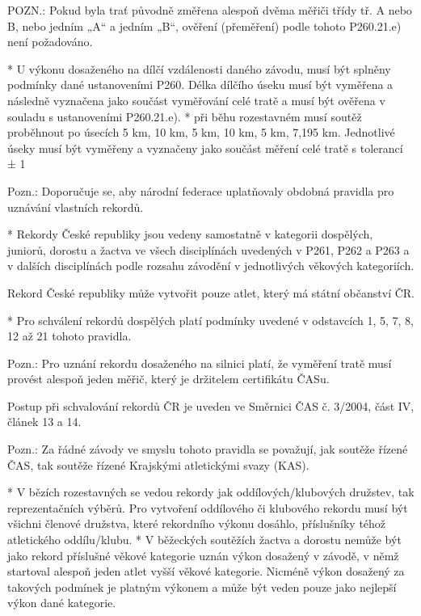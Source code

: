   POZN.: Pokud byla trať původně změřena alespoň dvěma měřiči třídy tř. A nebo B, nebo jedním „A“ a jedním „B“, ověření (přeměření) podle tohoto P260.21.e) není požadováno.

  * U výkonu dosaženého na dílčí vzdálenosti daného závodu, musí být splněny podmínky dané ustanoveními P260. Délka dílčího úseku musí být vyměřena a následně vyznačena jako součást vyměřování celé tratě a musí být ověřena v souladu s ustanoveními P260.21.e).
  * při běhu rozestavném musí soutěž proběhnout po úsecích 5 km, 10 km, 5 km, 10 km, 5 km, 7,195 km. Jednotlivé úseky musí být vyměřeny a vyznačeny jako součást měření celé tratě s tolerancí ± 1 %
  \enditems

Pozn.: Doporučuje se, aby národní federace uplatňovaly obdobná pravidla pro uznávání vlastních rekordů.

* Rekordy České republiky jsou vedeny samostatně v kategorii dospělých, juniorů, dorostu a žactva ve všech disciplínách uvedených v P261, P262 a P263 a v dalších disciplínách podle rozsahu závodění v jednotlivých věkových kategoriích.

Rekord České republiky může vytvořit pouze atlet, který má státní občanství ČR.

* Pro schválení rekordů dospělých platí podmínky uvedené v odstavcích 1, 5, 7, 8, 12 až 21 tohoto pravidla.

Pozn.: Pro uznání rekordu dosaženého na silnici platí, že vyměření tratě musí provést alespoň jeden měřič, který je držitelem certifikátu ČASu.

Postup při schvalování rekordů ČR je uveden ve Směrnici ČAS č. 3/2004, část IV, článek 13 a 14.

Pozn.: Za řádné závody ve smyslu tohoto pravidla se považují, jak soutěže řízené ČAS, tak soutěže řízené Krajskými atletickými svazy (KAS).

* V bězích rozestavných se vedou rekordy jak oddílových/klubových družstev, tak reprezentačních výběrů. Pro vytvoření oddílového či klubového rekordu musí být všichni členové družstva, které rekordního výkonu dosáhlo, příslušníky téhož atletického oddílu/klubu.
* V běžeckých soutěžích žactva a dorostu nemůže být jako rekord příslušné věkové kategorie uznán výkon dosažený v závodě, v němž startoval alespoň jeden atlet vyšší věkové kategorie. Nicméně výkon dosažený za takových podmínek je platným výkonem a může být veden pouze jako nejlepší výkon dané kategorie.
\enditems

